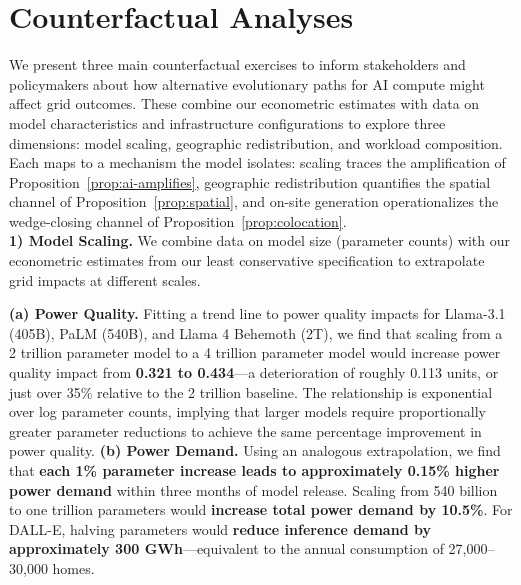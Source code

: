 \documentclass[a4paper,fleqn,longmktitle]{cas-sc}
\theoremstyle{plain}
\theoremstyle{definition}
\begin{document}

\section{Counterfactual Analyses}
\label{sec:counterfactuals}

We present three main counterfactual exercises to inform stakeholders and policymakers about how alternative evolutionary paths for AI compute might affect grid outcomes. These combine our econometric estimates with data on model characteristics and infrastructure configurations to explore three dimensions: model scaling, geographic redistribution, and workload composition. Each maps to a mechanism the model isolates: scaling traces the amplification of Proposition~\ref{prop:ai-amplifies}, geographic redistribution quantifies the spatial channel of Proposition~\ref{prop:spatial}, and on-site generation operationalizes the wedge-closing channel of Proposition~\ref{prop:colocation}.\\

\noindent\textbf{1) Model Scaling.} We combine data on model size (parameter counts) with our econometric estimates from our least conservative specification to extrapolate grid impacts at different scales.

\noindent\textbf{(a) Power Quality.} Fitting a trend line to power quality impacts for Llama-3.1 (405B), PaLM (540B), and Llama 4 Behemoth (2T), we find that scaling from a 2 trillion parameter model to a 4 trillion parameter model would increase power quality impact from \textbf{0.321 to 0.434}---a deterioration of roughly 0.113 units, or just over 35\% relative to the 2 trillion baseline. The relationship is exponential over log parameter counts, implying that larger models require proportionally greater parameter reductions to achieve the same percentage improvement in power quality. \textbf{(b) Power Demand.} Using an analogous extrapolation, we find that \textbf{each 1\% parameter increase leads to approximately 0.15\% higher power demand} within three months of model release. Scaling from 540 billion to one trillion parameters would \textbf{increase total power demand by 10.5\%}. For DALL-E, halving parameters would \textbf{reduce inference demand by approximately 300 GWh}---equivalent to the annual consumption of 27,000--30,000 homes.\\
\end{document}
